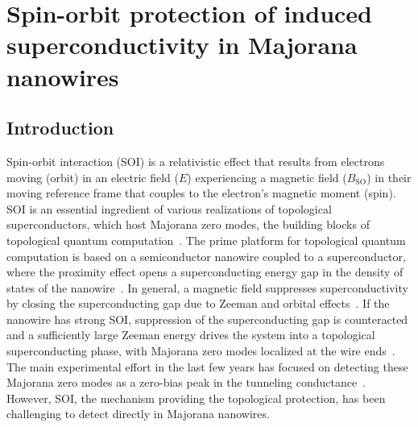 \chapter[Spin-orbit protection of induced SC in Majorana nanowires]{Spin-orbit protection of induced superconductivity in Majorana nanowires}
\label{ch:spinorbit}


\newpage
\noindent
\section{Introduction}

Spin-orbit interaction (SOI) is a relativistic effect that results from electrons moving (orbit) in an electric field ($E$) experiencing a magnetic field ($B_{\mathrm{SO}}$) in their moving reference frame that couples to the electron's magnetic moment (spin).
SOI is an essential ingredient of various realizations of topological superconductors, which host Majorana zero modes, the building blocks of topological quantum computation~\cite{Kitaev2001,Fu2008,Nayak2008}.
The prime platform for topological quantum computation is based on a semiconductor nanowire coupled to a superconductor, where the proximity effect opens a superconducting energy gap in the density of states of the nanowire~\cite{Lutchyn2010,Oreg2010}.
In general, a magnetic field suppresses superconductivity by closing the superconducting gap due to Zeeman and orbital effects~\cite{Nijholt2016}.
If the nanowire has strong SOI, suppression of the superconducting gap is counteracted and a sufficiently large Zeeman energy drives the system into a topological superconducting phase, with Majorana zero modes localized at the wire ends~\cite{Lutchyn2010,Oreg2010}.
The main experimental effort in the last few years has focused on detecting these Majorana zero modes as a zero-bias peak in the tunneling conductance~\cite{Mourik2012,Albrecht2016,Deng2016,Guel2018,Zhang2018,Lutchyn2018,Aguado2017}.
However, SOI, the mechanism providing the topological protection, has been challenging to detect directly in Majorana nanowires.

